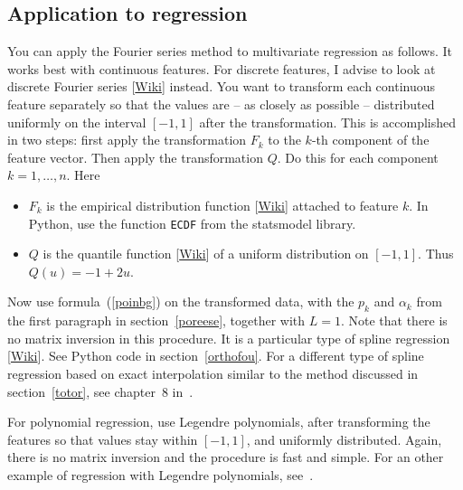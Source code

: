 \documentclass[oneside,10pt]{book}
\begin{document}
\subsection{Application to regression}\label{oiuty}

You can apply the Fourier series method to multivariate regression as follows. It works best with continuous features. For discrete features, I advise to look at \textcolor{index}{discrete Fourier series} [\href{https://en.wikipedia.org/wiki/Discrete_Fourier_series}{Wiki}] instead. You want to transform each continuous feature separately so that the values are -- as closely as possible -- distributed uniformly on the interval $[-1, 1]$ after the transformation. This is accomplished in two steps: first apply the transformation $F_k$ to the $k$-th component of the feature vector. Then apply the transformation $Q$. Do this for each component $k=1,\dots,n$.  Here \vspace{1ex}

\begin{itemize}
\item $F_k$ is the
\textcolor{index}{empirical distribution function} [\href{https://en.wikipedia.org/wiki/Empirical_distribution_function}{Wiki}] attached to feature $k$. In Python, use the function \texttt{ECDF} from the statsmodel library.
\item $Q$ is the \textcolor{index}{quantile function} [\href{https://en.wikipedia.org/wiki/Quantile_function}{Wiki}] of a uniform distribution on $[-1, 1]$. Thus $Q(u) = -1 + 2u$.
\end{itemize} \vspace{1ex}

\noindent Now use formula~(\ref{poinbg}) on the transformed data, with the $p_k$ and $\alpha_k$ from the first paragraph
in section~\ref{poreese}, together with $L=1$. Note that there is no matrix inversion in this procedure. It is a
particular type of \textcolor{index}{spline regression} [\href{https://en.wikipedia.org/wiki/Multivariate_adaptive_regression_spline}{Wiki}]. See Python code in section~\ref{orthofou}. For a different type of spline regression based on exact interpolation similar to the
 method discussed in section~\ref{totor}, see chapter~8 in~\cite{vgelsevier}.

For polynomial regression, use Legendre polynomials, after transforming the features so that values stay within $[-1, 1]$, and uniformly distributed. Again, there is no matrix inversion and the procedure is fast and simple. For an other example of regression
 with Legendre polynomials, see~\cite{54re2022w}.
\end{document}

